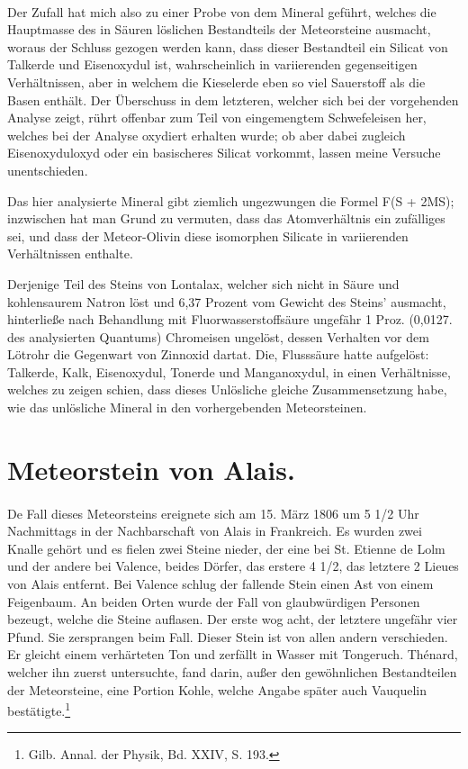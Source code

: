 \documentclass[a4paper, 11pt, oneside]{article}
\begin{document}
\paragraph{}
Der Zufall hat mich also zu einer Probe von dem Mineral geführt, welches die Hauptmasse des in Säuren löslichen Bestandteils der Meteorsteine ausmacht, woraus der Schluss gezogen werden kann, dass dieser Bestandteil ein Silicat von Talkerde und Eisenoxydul ist, wahrscheinlich in variierenden gegenseitigen Verhältnissen, aber in welchem die Kieselerde eben so viel Sauerstoff als die Basen enthält. Der Überschuss in dem letzteren, welcher sich bei der vorgehenden Analyse zeigt, rührt offenbar zum Teil von eingemengtem Schwefeleisen her, welches bei der Analyse oxydiert erhalten wurde; ob aber dabei zugleich Eisenoxyduloxyd oder ein basischeres Silicat vorkommt, lassen meine Versuche unentschieden.

Das hier analysierte Mineral gibt ziemlich ungezwungen die Formel F(S + 2MS); inzwischen hat man Grund zu vermuten, dass das Atomverhältnis ein zufälliges sei, und dass der Meteor-Olivin diese isomorphen Silicate in variierenden Verhältnissen enthalte.

Derjenige Teil des Steins von Lontalax, welcher sich nicht in Säure und kohlensaurem Natron löst und 6,37 Prozent vom Gewicht des Steins’ ausmacht, hinterließe nach Behandlung mit Fluorwasserstoffsäure ungefähr 1 Proz. (0,0127. des analysierten Quantums) Chromeisen ungelöst, dessen Verhalten vor dem Lötrohr die Gegenwart von Zinnoxid dartat. Die, Flusssäure hatte aufgelöst: Talkerde, Kalk, Eisenoxydul, Tonerde und Manganoxydul, in einen Verhältnisse, welches zu zeigen schien, dass dieses Unlösliche gleiche Zusammensetzung habe, wie das unlösliche Mineral in den vorhergebenden Meteorsteinen.

\section{Meteorstein von Alais.}
\paragraph{}
De Fall dieses Meteorsteins ereignete sich am 15. März 1806 um 5 1/2 Uhr Nachmittags in der Nachbarschaft von Alais in Frankreich. Es wurden zwei Knalle gehört und es fielen zwei Steine nieder, der eine bei St. Etienne de Lolm und der andere bei Valence, beides Dörfer, das erstere 4 1/2, das letztere 2 Lieues von Alais entfernt. Bei Valence schlug der fallende Stein einen Ast von einem Feigenbaum. An beiden Orten wurde der Fall von glaubwürdigen Personen bezeugt, welche die Steine auflasen. Der erste wog acht, der letztere ungefähr vier Pfund. Sie zersprangen beim Fall. Dieser Stein ist von allen andern verschieden. Er gleicht einem verhärteten Ton und zerfällt in Wasser mit Tongeruch. Thénard, welcher ihn zuerst untersuchte, fand darin, außer den gewöhnlichen Bestandteilen der Meteorsteine, eine Portion Kohle, welche Angabe später auch Vauquelin bestätigte.\footnote{Gilb. Annal. der Physik, Bd. XXIV, S. 193.}
\end{document}
